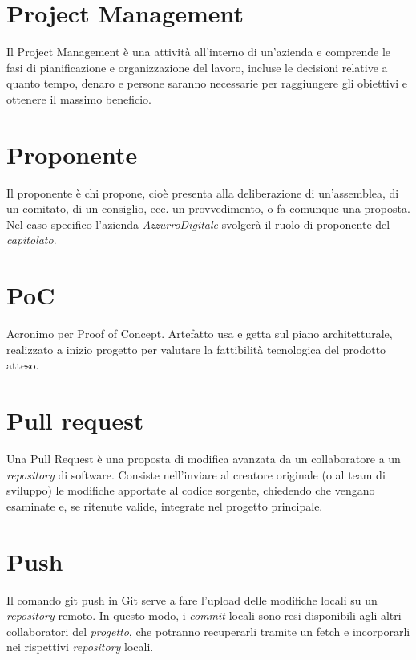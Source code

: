 \section{Project Management}
Il Project Management è una attività all’interno di un’azienda e comprende le fasi di pianificazione e organizzazione del lavoro, incluse le decisioni relative a quanto tempo, denaro e persone saranno necessarie per raggiungere gli obiettivi e ottenere il massimo beneficio. 

\section{Proponente}
Il proponente è chi propone, cioè presenta alla deliberazione di un'assemblea, di un comitato, di un consiglio, ecc. un provvedimento, o fa comunque una proposta. Nel caso specifico l'azienda \emph{AzzurroDigitale} svolgerà il ruolo di proponente del \emph{capitolato}.

\section{PoC}
Acronimo per Proof of Concept. Artefatto usa e getta sul piano architetturale, realizzato a inizio progetto per valutare la fattibilità tecnologica del prodotto atteso.

\section{Pull request}
Una Pull Request è una proposta di modifica avanzata da un collaboratore a un \emph{repository} di software. Consiste nell'inviare al creatore originale (o al team di sviluppo) le modifiche apportate al codice sorgente, chiedendo che vengano esaminate e, se ritenute valide, integrate nel progetto principale.

\section{Push}
Il comando git push in Git serve a fare l’upload delle modifiche locali su un \emph{repository} remoto. In questo modo, i \emph{commit} locali sono resi disponibili agli altri collaboratori del \emph{progetto}, che potranno recuperarli tramite un fetch e incorporarli nei rispettivi \emph{repository} locali.